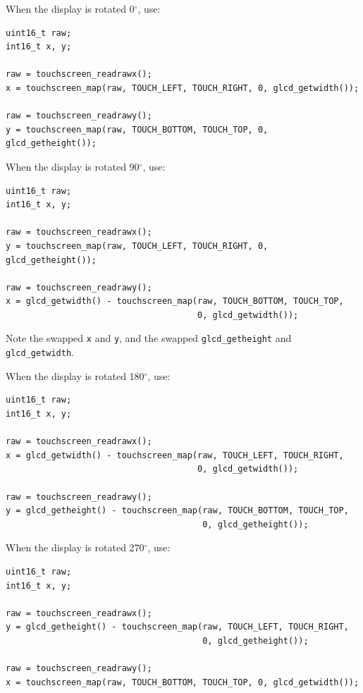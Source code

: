 \documentclass[12pt]{article}
\begin{document}
When the display is rotated 0$^\circ$, use:

\begin{lstlisting}
uint16_t raw;
int16_t x, y;

raw = touchscreen_readrawx();
x = touchscreen_map(raw, TOUCH_LEFT, TOUCH_RIGHT, 0, glcd_getwidth());

raw = touchscreen_readrawy();
y = touchscreen_map(raw, TOUCH_BOTTOM, TOUCH_TOP, 0, glcd_getheight());
\end{lstlisting}

When the display is rotated 90$^\circ$, use:

\begin{lstlisting}
uint16_t raw;
int16_t x, y;

raw = touchscreen_readrawx();
y = touchscreen_map(raw, TOUCH_LEFT, TOUCH_RIGHT, 0, glcd_getheight());

raw = touchscreen_readrawy();
x = glcd_getwidth() - touchscreen_map(raw, TOUCH_BOTTOM, TOUCH_TOP,
                                      0, glcd_getwidth());
\end{lstlisting}

Note the swapped \lstinline|x| and \lstinline|y|, and the swapped \lstinline|glcd_getheight| and \lstinline|glcd_getwidth|.

When the display is rotated 180$^\circ$, use:

\begin{lstlisting}
uint16_t raw;
int16_t x, y;

raw = touchscreen_readrawx();
x = glcd_getwidth() - touchscreen_map(raw, TOUCH_LEFT, TOUCH_RIGHT,
                                      0, glcd_getwidth());

raw = touchscreen_readrawy();
y = glcd_getheight() - touchscreen_map(raw, TOUCH_BOTTOM, TOUCH_TOP,
                                       0, glcd_getheight());
\end{lstlisting}

When the display is rotated 270$^\circ$, use:

\begin{lstlisting}
uint16_t raw;
int16_t x, y;

raw = touchscreen_readrawx();
y = glcd_getheight() - touchscreen_map(raw, TOUCH_LEFT, TOUCH_RIGHT,
                                       0, glcd_getheight());

raw = touchscreen_readrawy();
x = touchscreen_map(raw, TOUCH_BOTTOM, TOUCH_TOP, 0, glcd_getwidth());
\end{lstlisting}
\end{document}
